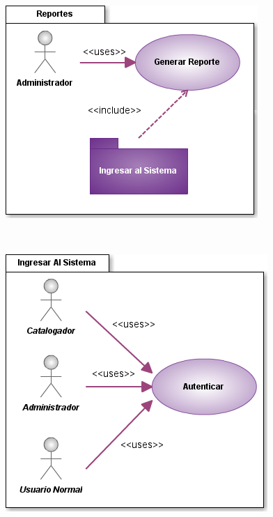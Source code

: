 \documentclass[]{article}
\begin{document}
        \begin{minipage}[c]{1\linewidth}
                \centering
                \includegraphics[scale=.7]{casosUso/CUReportes}
        \end{minipage}\\[2cm]
        
        \begin{minipage}[c]{1\linewidth}
                \begin{center}
                \includegraphics[scale=.7]{casosUso/CUAutenticar}                
                \end{center}
        \end{minipage}
        
\end{document}
